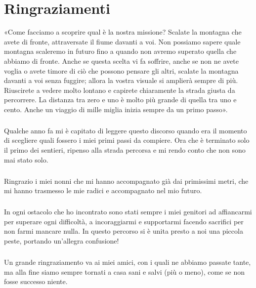 \chapter{Ringraziamenti}

«Come facciamo a scoprire qual è la nostra missione?
Scalate la montagna che avete di fronte, attraversate il fiume davanti a voi.
Non possiamo sapere quale montagna scaleremo in futuro fino a quando non avremo superato quella che abbiamo di fronte.
Anche se questa	scelta vi fa soffrire, anche se non ne avete voglia o avete timore di ciò che possono pensare gli altri, scalate la montagna davanti a voi senza fuggire;
allora la vostra visuale si amplierà sempre di più.
Riuscirete a vedere molto lontano e capirete chiaramente la strada giusta da percorrere.
La distanza tra zero e uno è molto più grande di quella tra uno e cento.
Anche un viaggio di mille miglia inizia sempre da un primo passo».

\paragraph{}
Qualche anno fa mi è capitato di leggere questo discorso quando era il momento di scegliere quali fossero i miei primi passi da compiere. Ora che è terminato solo il primo dei sentieri, ripenso alla strada percorsa e mi rendo conto che non sono mai stato solo.

\paragraph{}
Ringrazio i miei nonni che mi hanno accompagnato già dai primissimi metri, che mi hanno trasmesso le mie radici e accompagnato nel mio futuro.

\paragraph{}
In ogni ostacolo che ho incontrato sono stati sempre i miei genitori ad affiancarmi per superare ogni difficoltà, a incoraggiarmi e supportarmi facendo sacrifici per non farmi mancare nulla. In questo percorso si è unita presto a noi una piccola peste, portando un'allegra confusione!

\paragraph{}
Un grande ringraziamento va ai miei amici, con i quali ne abbiamo passate tante, ma alla fine siamo sempre tornati a casa sani e salvi (più o meno), come se non fosse successo niente.

